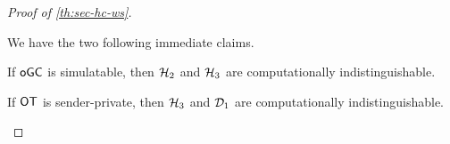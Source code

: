 \begin{proof}[Proof of \cref{th:sec-hc-ws}]
\begin{description}
    We have the two following immediate claims.
    \begin{claim}
      If ${\mathsf{oGC}}$ is simulatable, then $\mathcal{H}_2$ and $\mathcal{H}_3$ are computationally indistinguishable.
    \end{claim}

    \begin{claim}
      If $\mathsf{OT}$ is sender-private, then $\mathcal{H}_3$ and $\mathcal{D}_1$ are computationally indistinguishable.
    \end{claim}
  \end{description}
\end{proof}


